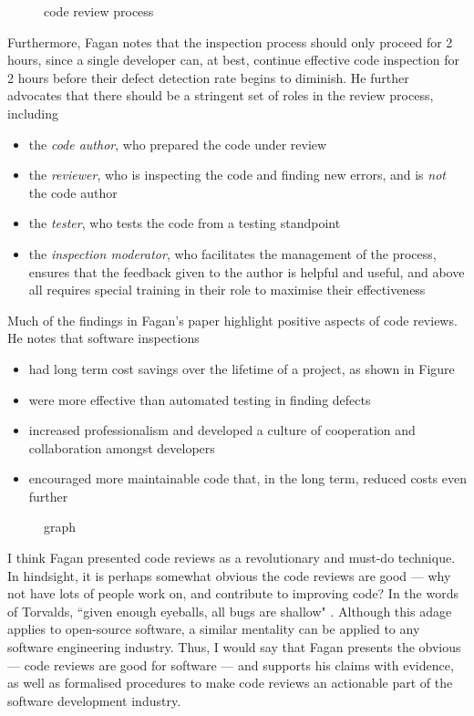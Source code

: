 \begin{figure}
\FIXME code review process 
\end{figure}

Furthermore, Fagan \cite{AdvancesInSoftwareInspection} notes that the inspection process should only proceed for 2 hours, since a single developer
can, at best, continue effective code inspection for 2 hours before their defect detection rate
begins to diminish.
He further advocates that there should be a stringent set of roles in the review process, including
\begin{itemize}
	\item the {\em code author}, who prepared the code under review
	\item the {\em reviewer}, who is inspecting the code and finding new errors, and is {\it not} the
		code author
	\item the {\em tester}, who tests the code from a testing standpoint
	\item the {\em inspection moderator}, who facilitates the management of the process, ensures that
		the feedback given to the author is helpful and useful, and above all requires special training
		in their role to maximise their effectiveness
\end{itemize}

Much of the findings in Fagan's paper highlight positive aspects of code reviews.
He notes that software inspections
\begin{itemize}
	\item had long term cost savings over the lifetime of a project, as shown in Figure \FIXME
	\item were more effective than automated testing in finding defects
	\item increased professionalism and developed a culture of cooperation and collaboration amongst
		developers
	\item encouraged more maintainable code that, in the long term, reduced costs even further
\end{itemize}

\begin{figure}
	\FIXME graph
\end{figure}

I think Fagan presented code reviews as a revolutionary and must-do technique.
In hindsight, it is perhaps somewhat obvious the code reviews are good --- why not have lots of
people work on, and contribute to improving code?
In the words of Torvalds, ``given enough eyeballs, all bugs are shallow" \FIXME.
Although this adage applies to open-source software, a similar mentality can be applied to any
software engineering industry.
Thus, I would say that Fagan presents the obvious --- code reviews are good for software --- and
supports his claims with evidence, as well as formalised procedures to make code reviews an
actionable part of the software development industry.

